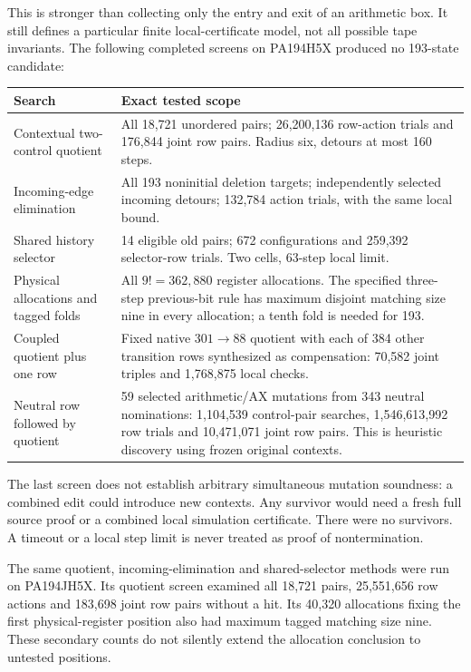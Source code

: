This is stronger than collecting only the entry and exit of an arithmetic
box.  It still defines a particular finite local-certificate model, not
all possible tape invariants.  The following completed screens on
PA194H5X produced no 193-state candidate:
\begin{center}\small
\begin{tabularx}{\textwidth}{@{}p{}X@{}}
\toprule
Search & Exact tested scope\\\midrule
Contextual two-control quotient & All 18,721 unordered pairs; 26,200,136 row-action trials and 176,844 joint row pairs. Radius six, detours at most 160 steps.\\
Incoming-edge elimination & All 193 noninitial deletion targets; independently selected incoming detours; 132,784 action trials, with the same local bound.\\
Shared history selector & 14 eligible old pairs; 672 configurations and 259,392 selector-row trials. Two cells, 63-step local limit.\\
Physical allocations and tagged folds & All $9!=362,880$ register allocations. The specified three-step previous-bit rule has maximum disjoint matching size nine in every allocation; a tenth fold is needed for 193.\\
Coupled quotient plus one row & Fixed native $301\to88$ quotient with each of 384 other transition rows synthesized as compensation: 70,582 joint triples and 1,768,875 local checks.\\
Neutral row followed by quotient & 59 selected arithmetic/AX mutations from 343 neutral nominations: 1,104,539 control-pair searches, 1,546,613,992 row trials and 10,471,071 joint row pairs. This is heuristic discovery using frozen original contexts.\\
\bottomrule
\end{tabularx}
\end{center}

The last screen does not establish arbitrary simultaneous mutation
soundness: a combined edit could introduce new contexts.  Any survivor
would need a fresh full source proof or a combined local simulation
certificate.  There were no survivors.  A timeout or a local step limit
is never treated as proof of nontermination.

The same quotient, incoming-elimination and shared-selector methods were
run on PA194JH5X.  Its quotient screen examined all 18,721 pairs,
25,551,656 row actions and 183,698 joint row pairs without a hit.
Its 40,320 allocations fixing the first physical-register position also
had maximum tagged matching size nine.  These secondary counts do not
silently extend the allocation conclusion to untested positions.

